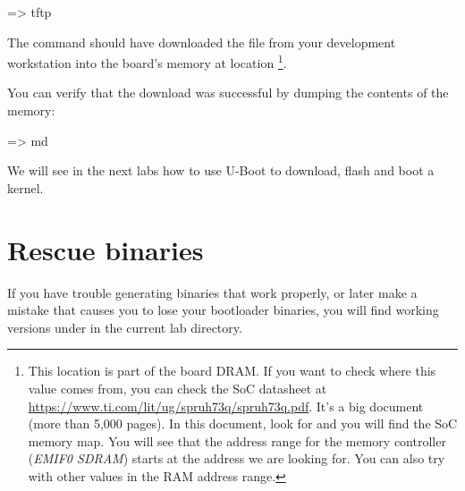 \begin{ubootinput}
=> tftp %
\end{ubootinput}

The  command should have downloaded the
 file from your development workstation into
the board's memory at location {\tt \zimageboardaddr}\footnote{
This location is part of the board DRAM. If you want
to check where this value comes from, you can check the SoC
datasheet at
\url{https://www.ti.com/lit/ug/spruh73q/spruh73q.pdf}.
It's a big document (more than 5,000 pages). In this document, look
for  and you will find the SoC memory map.
You will see that the address range for the memory controller
({\em EMIF0 SDRAM})
starts at the address we are looking for.
You can also try with other values in the RAM address range.}.

You can verify that the download was successful by dumping the
contents of the memory:

\begin{ubootinput}
=> md %
\end{ubootinput}

We will see in the next labs how to use U-Boot to download, flash and
boot a kernel.


\section{Rescue binaries}

If you have trouble generating binaries that work properly, or later
make a mistake that causes you to lose your bootloader binaries, you
will find working versions under  in the current lab
directory.
